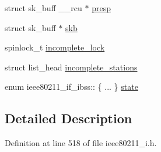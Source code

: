 \begin{DoxyCompactItemize}
\item 
struct sk\-\_\-buff \-\_\-\-\_\-rcu $\ast$ \hyperlink{structieee80211__if__ibss_a9daf15f2ed9d31b8120ac9c337ca9c62}{presp}
\item 
struct sk\-\_\-buff $\ast$ \hyperlink{structieee80211__if__ibss_aeba6836824708325a83121030f092c30}{skb}
\item 
spinlock\-\_\-t \hyperlink{structieee80211__if__ibss_a8356eead4fd0be0edf4ea2e0237a4de8}{incomplete\-\_\-lock}
\item 
struct list\-\_\-head \hyperlink{structieee80211__if__ibss_a18703abd5d82801e889c2c13282d2f5c}{incomplete\-\_\-stations}
\item 
enum ieee80211\-\_\-if\-\_\-ibss\-:: \{ ... \}  \hyperlink{structieee80211__if__ibss_a3253c6d1cd5d679b637262e95a0986a1}{state}
\end{DoxyCompactItemize}


\subsection{Detailed Description}


Definition at line 518 of file ieee80211\-\_\-i.\-h.



